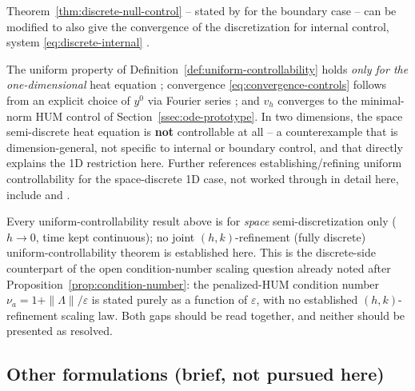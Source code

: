 \begin{remark}
  \label{rem:internal-extension}
  Theorem~\ref{thm:discrete-null-control} -- stated by \citeauthor{lopez1998some}
  for the boundary case -- can be modified to also give the convergence of the
  discretization for internal control, system \eqref{eq:discrete-internal}
  \citep[Rem.~3.4]{zuazua2006control}.
\end{remark}

\begin{remark}
  \label{rem:1d-only}
  The uniform property of Definition~\ref{def:uniform-controllability} holds
  \emph{only for the one-dimensional} heat equation \citep{lopez1998some};
  convergence \eqref{eq:convergence-controls} follows from an explicit choice
  of $y^0$ via Fourier series \citep[Rem.~1.2]{lopez1998some}; and $v_h$
  converges to the minimal-norm HUM control of
  Section~\ref{ssec:ode-prototype}. In two dimensions, the space semi-discrete
  heat equation is \textbf{not} controllable at all \citep{zuazua2005propagation}
  -- a counterexample that is dimension-general, not specific to internal or
  boundary control, and that directly explains the 1D restriction here.
  Further references establishing/refining uniform controllability for the
  space-discrete 1D case, not worked through in detail here, include
  \citet{labbe2006uniform} and \citet{boyer2010discrete}.
\end{remark}

\begin{remark}
  \label{rem:hk-gap}
  Every uniform-controllability result above is for \emph{space}
  semi-discretization only ($h\to0$, time kept continuous); no joint
  $(h,k)$-refinement (fully discrete) uniform-controllability theorem is
  established here. This is the discrete-side counterpart of the open
  condition-number scaling question already noted after
  Proposition~\ref{prop:condition-number}: the penalized-HUM condition number
  $\nu_a = 1+\|\Lambda\|/\varepsilon$ is stated purely as a function of
  $\varepsilon$, with no established $(h,k)$-refinement scaling law. Both gaps
  should be read together, and neither should be presented as resolved.
\end{remark}

\subsection{Other formulations (brief, not pursued here)}
\label{ssec:other-formulations}

